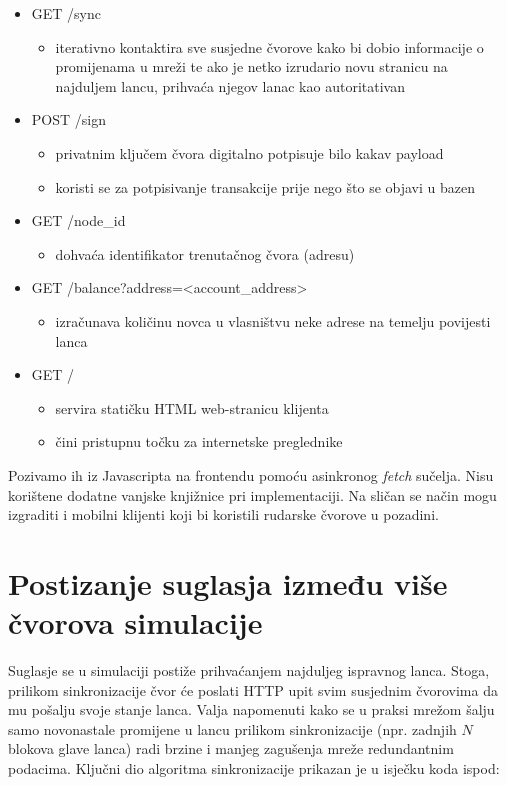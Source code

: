 \documentclass[utf8, zavrsni]{fer}
\begin{document}
\begin{itemize}
\begin{itemize}
	\end{itemize}
	\item GET    /sync
	\begin{itemize}
		\item iterativno kontaktira sve susjedne čvorove kako bi dobio informacije o promijenama u mreži te ako je netko izrudario novu stranicu na najduljem lancu, prihvaća njegov lanac kao autoritativan
	\end{itemize}
	\item POST   /sign
	\begin{itemize}
		\item privatnim ključem čvora digitalno potpisuje bilo kakav payload
		\item koristi se za potpisivanje transakcije prije nego što se objavi u bazen
	\end{itemize}
	\item GET    /node\_id
	\begin{itemize}
		\item dohvaća identifikator trenutačnog čvora (adresu)
	\end{itemize}
	\item GET    /balance?address=<account\_address>
	\begin{itemize}
		\item izračunava količinu novca u vlasništvu neke adrese na temelju povijesti lanca
	\end{itemize}
	\item GET    /
	\begin{itemize}
		\item servira statičku HTML web-stranicu klijenta
		\item čini pristupnu točku za internetske preglednike
	\end{itemize}
\end{itemize}

Pozivamo ih iz Javascripta na frontendu pomoću asinkronog \textit{fetch} sučelja. Nisu korištene dodatne vanjske knjižnice pri implementaciji. Na sličan se način mogu izgraditi i mobilni klijenti koji bi koristili rudarske čvorove u pozadini.

\section{Postizanje suglasja između više čvorova simulacije}
Suglasje se u simulaciji postiže prihvaćanjem najduljeg ispravnog lanca. Stoga, prilikom sinkronizacije čvor će poslati HTTP upit svim susjednim čvorovima da mu pošalju svoje stanje lanca. Valja napomenuti kako se u praksi mrežom šalju samo novonastale promijene u lancu prilikom sinkronizacije (npr. zadnjih $ N $ blokova glave lanca) radi brzine i manjeg zagušenja mreže redundantnim podacima. Ključni dio algoritma sinkronizacije prikazan je u isječku koda ispod:
\end{document}
